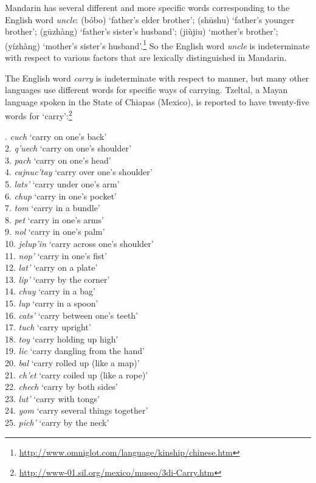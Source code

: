 Mandarin has several different and more specific words corresponding to the English word \textit{uncle}:  (bóbo) ‘father’s elder brother’;  (sh\=ushu) ‘father’s younger brother’;  (g\=uzhàng) ‘father’s sister’s husband’;  (jiùjiu) ‘mother’s brother’;  (yízhàng) ‘mother’s sister’s husband’.\footnote{\url{http://www.omniglot.com/language/kinship/chinese.htm}}  So the English word \textit{uncle} is indeterminate with respect to various factors that are lexically distinguished in Mandarin.



The English word \textit{carry} is indeterminate with respect to manner, but many other languages use different words for specific ways of carrying. Tzeltal, a Mayan language spoken in the State of Chiapas (Mexico), is reported to have twenty-five words for ‘carry’:\footnote{\url{http://www-01.sil.org/mexico/museo/3di-Carry.htm}} 


. \textit{cuch} ‘carry on one’s back’\\
2. \textit{q'uech} ‘carry on one’s shoulder’ \\
3. \textit{pach} ‘carry on one’s head’ \\
4. \textit{cajnuc'tay} ‘carry over one’s shoulder’\\
5. \textit{lats'} ‘carry under one’s arm’\\
6. \textit{chup} ‘carry in one’s pocket’\\
7. \textit{tom} ‘carry in a bundle’\\
8. \textit{pet} ‘carry in one’s arms’\\
9. \textit{nol} ‘carry in one’s palm’\\
10. \textit{jelup'in} ‘carry across one’s shoulder’\\
11. \textit{nop'} ‘carry in one’s fist’\\
12. \textit{lat'} ‘carry on a plate’\\
13. \textit{lip'} ‘carry by the corner’\\
14. \textit{chuy} ‘carry in a bag’\\
15. \textit{lup} ‘carry in a spoon’\\
16. \textit{cats'} ‘carry between one’s teeth’\\
17. \textit{tuch} ‘carry upright’\\
18. \textit{toy} ‘carry holding up high’\\
19. \textit{lic} ‘carry dangling from the hand’\\
20. \textit{bal} ‘carry rolled up (like a map)’\\
21. \textit{ch'et} ‘carry coiled up (like a rope)’\\
22. \textit{chech} ‘carry by both sides’\\
23. \textit{lut'} ‘carry with tongs’\\
24. \textit{yom} ‘carry several things together’\\
25. \textit{pich'} ‘carry by the neck’
\z


